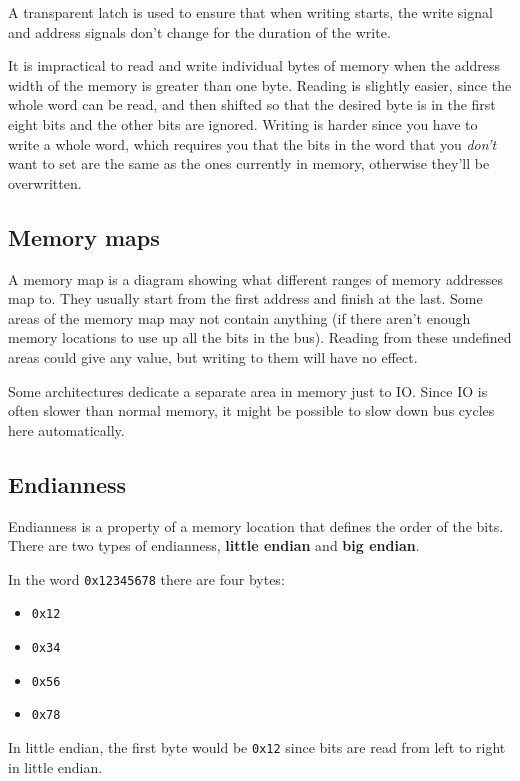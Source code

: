 A transparent latch is used to ensure that when writing starts, the write signal
and address signals don't change for the duration of the write.

It is impractical to read and write individual bytes of memory when the address
width of the memory is greater than one byte. Reading is slightly easier, since
the whole word can be read, and then shifted so that the desired byte is in the
first eight bits and the other bits are ignored. Writing is harder since you
have to write a whole word, which requires you that the bits in the word that
you {\it don't} want to set are the same as the ones currently in memory,
otherwise they'll be overwritten.

\subsection{Memory maps}

A memory map is a diagram showing what different ranges of memory addresses map
to. They usually start from the first address and finish at the last. Some areas
of the memory map may not contain anything (if there aren't enough memory
locations to use up all the bits in the bus). Reading from these undefined areas
could give any value, but writing to them will have no effect.

Some architectures dedicate a separate area in memory just to IO. Since IO is
often slower than normal memory, it might be possible to slow down bus cycles
here automatically.

\subsection{Endianness}

Endianness is a property of a memory location that defines the order of the
bits. There are two types of endianness, {\bf little endian} and {\bf big
endian}.

In the word {\tt 0x12345678} there are four bytes:
\begin{itemize}
	\item {\tt 0x12}
	\item {\tt 0x34}
	\item {\tt 0x56}
	\item {\tt 0x78}
\end{itemize}

In little endian, the first byte would be {\tt 0x12} since bits are read from
left to right in little endian.

